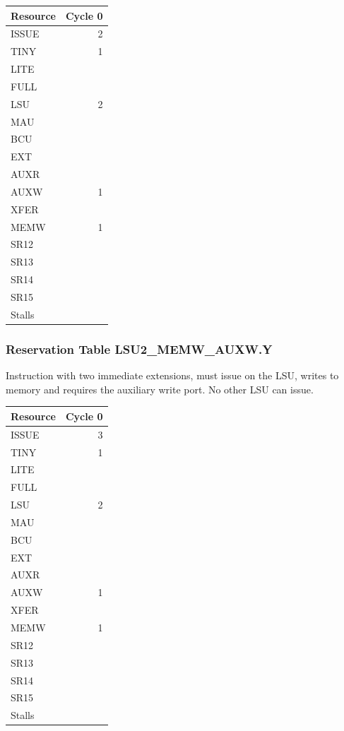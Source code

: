 \begin{tabular}{|l|r|} \hline
Resource	& Cycle 0 \\ \hline
\textsf{ISSUE}	& 2	\\
\textsf{TINY}	& 1	\\
\textsf{LITE}	& 	\\
\textsf{FULL}	& 	\\
\textsf{LSU}	& 2	\\
\textsf{MAU}	& 	\\
\textsf{BCU}	& 	\\
\textsf{EXT}	& 	\\
\textsf{AUXR}	& 	\\
\textsf{AUXW}	& 1	\\
\textsf{XFER}	& 	\\
\textsf{MEMW}	& 1	\\
\textsf{SR12}	& 	\\
\textsf{SR13}	& 	\\
\textsf{SR14}	& 	\\
\textsf{SR15}	& 	\\
\hline Stalls	& 	\\
\hline \end{tabular}

\subsubsection{Reservation Table LSU2\_MEMW\_AUXW.Y} \label{sec:reservation-LSU2-MEMW-AUXW.Y}

Instruction with two immediate extensions, must issue on the LSU, writes to memory and requires the auxiliary write port. No other LSU can issue.
\medskip

\begin{tabular}{|l|r|} \hline
Resource	& Cycle 0 \\ \hline
\textsf{ISSUE}	& 3	\\
\textsf{TINY}	& 1	\\
\textsf{LITE}	& 	\\
\textsf{FULL}	& 	\\
\textsf{LSU}	& 2	\\
\textsf{MAU}	& 	\\
\textsf{BCU}	& 	\\
\textsf{EXT}	& 	\\
\textsf{AUXR}	& 	\\
\textsf{AUXW}	& 1	\\
\textsf{XFER}	& 	\\
\textsf{MEMW}	& 1	\\
\textsf{SR12}	& 	\\
\textsf{SR13}	& 	\\
\textsf{SR14}	& 	\\
\textsf{SR15}	& 	\\
\hline Stalls	& 	\\
\hline \end{tabular}

